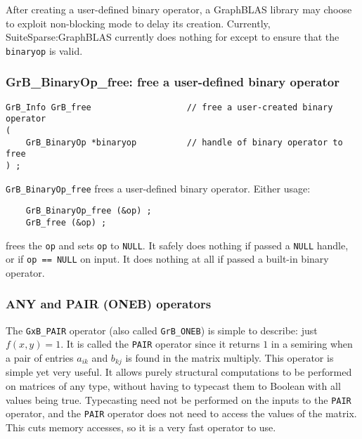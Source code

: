 \documentclass[12pt]{article}
\begin{document}
After creating a user-defined binary operator, a GraphBLAS library may choose
to exploit non-blocking mode to delay its creation.  Currently,
SuiteSparse:GraphBLAS currently does nothing for except to ensure that the
\verb'binaryop' is valid.

\subsubsection{{\sf GrB\_BinaryOp\_free:} free a user-defined binary operator}
\label{binaryop_free}

\begin{mdframed}[userdefinedwidth=6in]
{\footnotesize
\begin{verbatim}
GrB_Info GrB_free                   // free a user-created binary operator
(
    GrB_BinaryOp *binaryop          // handle of binary operator to free
) ;
\end{verbatim}
} \end{mdframed}

\verb'GrB_BinaryOp_free' frees a user-defined binary operator.
Either usage:

    {\small
    \begin{verbatim}
    GrB_BinaryOp_free (&op) ;
    GrB_free (&op) ; \end{verbatim}}

\noindent
frees the \verb'op' and sets \verb'op' to \verb'NULL'.
It safely does nothing if passed a \verb'NULL'
handle, or if \verb'op == NULL' on input.
It does nothing at all if passed a built-in binary operator.

\subsubsection{{\sf ANY} and {\sf PAIR} ({\sf ONEB}) operators}
\label{any_pair}

The \verb'GxB_PAIR' operator (also called \verb'GrB_ONEB') is simple to describe:
just $f(x,y)=1$.  It is called
the \verb'PAIR' operator since it returns $1$ in a semiring when a pair of
entries $a_{ik}$ and $b_{kj}$ is found in the matrix multiply.  This operator
is simple yet very useful.  It allows purely structural computations to be
performed on matrices of any type, without having to typecast them to Boolean
with all values being true.  Typecasting need not be performed on the inputs to
the \verb'PAIR' operator, and the \verb'PAIR' operator does not need to access
the values of the matrix.  This cuts memory accesses, so it is a very fast
operator to use.
\end{document}
